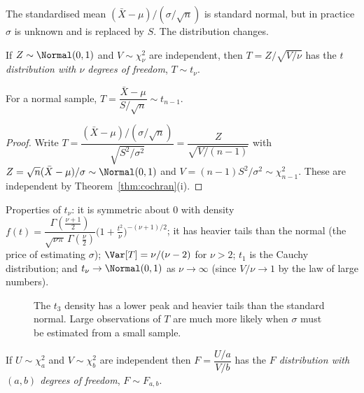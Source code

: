 The standardised mean $(\bar{X}-\mu)/(\sigma/\sqrt n)$ is standard normal, but in practice $\sigma$ is unknown and is replaced by $S$. The distribution changes.

\begin{definition}
If $Z\sim\Normal(0,1)$ and $V\sim\chi^2_\nu$ are independent, then $T=Z/\sqrt{V/\nu}$ has the \emph{$t$ distribution with $\nu$ degrees of freedom}, $T\sim t_\nu$.
\end{definition}

\begin{theorem}\label{thm:tstat}
For a normal sample, $T=\dfrac{\bar{X}-\mu}{S/\sqrt n}\sim t_{n-1}$.
\end{theorem}

\begin{proof}
Write $T=\dfrac{(\bar{X}-\mu)/(\sigma/\sqrt n)}{\sqrt{S^2/\sigma^2}}=\dfrac{Z}{\sqrt{V/(n-1)}}$ with $Z=\sqrt n(\bar{X}-\mu)/\sigma\sim\Normal(0,1)$ and $V=(n-1)S^2/\sigma^2\sim\chi^2_{n-1}$. These are independent by Theorem~\ref{thm:cochran}(i).
\end{proof}

Properties of $t_\nu$: it is symmetric about $0$ with density $f(t)=\dfrac{\Gamma(\frac{\nu+1}2)}{\sqrt{\nu\pi}\,\Gamma(\frac\nu2)}\big(1+\tfrac{t^2}\nu\big)^{-(\nu+1)/2}$; it has heavier tails than the normal (the price of estimating $\sigma$); $\Var[T]=\nu/(\nu-2)$ for $\nu>2$; $t_1$ is the Cauchy distribution; and $t_\nu\to\Normal(0,1)$ as $\nu\to\infty$ (since $V/\nu\to1$ by the law of large numbers).

\begin{figure}[h]
\centering
{}
\caption{The $t_3$ density has a lower peak and heavier tails than the standard normal. Large observations of $T$ are much more likely when $\sigma$ must be estimated from a small sample.}
\end{figure}

\begin{definition}[$F$ distribution]
If $U\sim\chi^2_{a}$ and $V\sim\chi^2_{b}$ are independent then $F=\dfrac{U/a}{V/b}$ has the \emph{$F$ distribution with $(a,b)$ degrees of freedom}, $F\sim F_{a,b}$.
\end{definition}

